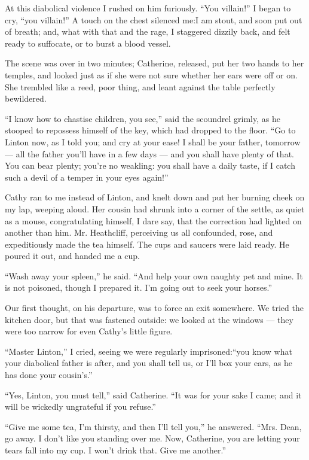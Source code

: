 \par At this diabolical violence I rushed on him furiously. “You villain!” I began to cry, “you villain!” A touch on the chest silenced me:I am stout, and soon put out of breath; and, what with that and the rage, I staggered dizzily back, and felt ready to suffocate, or to burst a blood vessel.
\par The scene was over in two minutes; Catherine, released, put her two hands to her temples, and looked just as if she were not sure whether her ears were off or on. She trembled like a reed, poor thing, and leant against the table perfectly bewildered.
\par “I know how to chastise children, you see,” said the scoundrel grimly, as he stooped to repossess himself of the key, which had dropped to the floor. “Go to Linton now, as I told you; and cry at your ease! I shall be your father, tomorrow — all the father you'll have in a few days — and you shall have plenty of that. You can bear plenty; you're no weakling: you shall have a daily taste, if I catch such a devil of a temper in your eyes again!”
\par Cathy ran to me instead of Linton, and knelt down and put her burning cheek on my lap, weeping aloud. Her cousin had shrunk into a corner of the settle, as quiet as a mouse, congratulating himself, I dare say, that the correction had lighted on another than him. Mr. Heathcliff, perceiving us all confounded, rose, and expeditiously made the tea himself. The cups and saucers were laid ready. He poured it out, and handed me a cup.
\par “Wash away your spleen,” he said. “And help your own naughty pet and mine. It is not poisoned, though I prepared it. I'm going out to seek your horses.”
\par Our first thought, on his departure, was to force an exit somewhere. We tried the kitchen door, but that was fastened outside: we looked at the windows — they were too narrow for even Cathy's little figure.
\par “Master Linton,” I cried, seeing we were regularly imprisoned:“you know what your diabolical father is after, and you shall tell us, or I'll box your ears, as he has done your cousin's.”
\par “Yes, Linton, you must tell,” said Catherine. “It was for your sake I came; and it will be wickedly ungrateful if you refuse.”
\par “Give me some tea, I'm thirsty, and then I'll tell you,” he answered. “Mrs. Dean, go away. I don't like you standing over me. Now, Catherine, you are letting your tears fall into my cup. I won't drink that. Give me another.”
